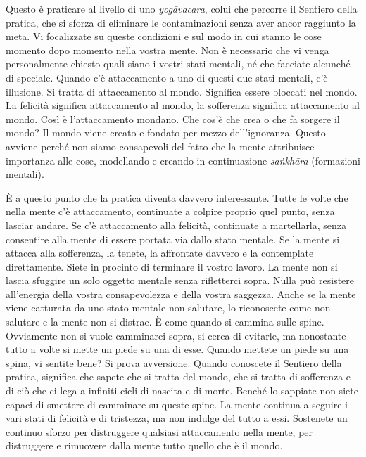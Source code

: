 Questo è praticare al livello di uno \emph{yogāvacara}, colui che
percorre il Sentiero della pratica, che si sforza di eliminare le
contaminazioni senza aver ancor raggiunto la meta. Vi focalizzate su
queste condizioni e sul modo in cui stanno le cose momento dopo momento
nella vostra mente. Non è necessario che vi venga personalmente chiesto
quali siano i vostri stati mentali, né che facciate alcunché di
speciale. Quando c'è attaccamento a uno di questi due stati mentali, c'è
illusione. Si tratta di attaccamento al mondo. Significa essere bloccati
nel mondo. La felicità significa attaccamento al mondo, la sofferenza
significa attaccamento al mondo. Così è l'attaccamento mondano. Che
cos'è che crea o che fa sorgere il mondo? Il mondo viene creato e
fondato per mezzo dell'ignoranza. Questo avviene perché non siamo
consapevoli del fatto che la mente attribuisce importanza alle cose,
modellando e creando in continuazione \emph{saṅkhāra} (formazioni
mentali).

È a questo punto che la pratica diventa davvero interessante. Tutte le
volte che nella mente c'è attaccamento, continuate a colpire proprio
quel punto, senza lasciar andare. Se c'è attaccamento alla felicità,
continuate a martellarla, senza consentire alla mente di essere portata
via dallo stato mentale. Se la mente si attacca alla sofferenza, la
tenete, la affrontate davvero e la contemplate direttamente. Siete in
procinto di terminare il vostro lavoro. La mente non si lascia sfuggire
un solo oggetto mentale senza rifletterci sopra. Nulla può resistere
all'energia della vostra consapevolezza e della vostra saggezza. Anche
se la mente viene catturata da uno stato mentale non salutare, lo
riconoscete come non salutare e la mente non si distrae. È come quando
si cammina sulle spine. Ovviamente non si vuole camminarci sopra, si
cerca di evitarle, ma nonostante tutto a volte si mette un piede su una
di esse. Quando mettete un piede su una spina, vi sentite bene? Si prova
avversione. Quando conoscete il Sentiero della pratica, significa che
sapete che si tratta del mondo, che si tratta di sofferenza e di ciò che
ci lega a infiniti cicli di nascita e di morte. Benché lo sappiate non
siete capaci di smettere di camminare su queste spine. La mente continua
a seguire i vari stati di felicità e di tristezza, ma non indulge del
tutto a essi. Sostenete un continuo sforzo per distruggere qualsiasi
attaccamento nella mente, per distruggere e rimuovere dalla mente tutto
quello che è il mondo.

